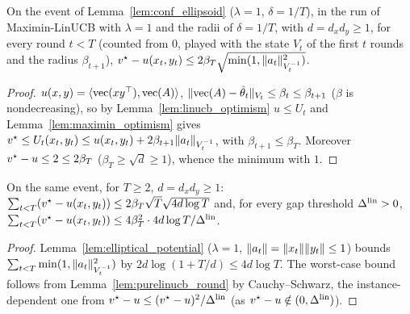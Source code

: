 \begin{lemma}
  \label{lem:purelinucb_round}
  \leanok
  On the event of Lemma~\ref{lem:conf_ellipsoid} ($\lambda = 1$, $\delta = 1/T$), in the run of
  Maximin-LinUCB with $\lambda = 1$ and the radii of $\delta = 1/T$, with $d = d_x d_y \ge 1$, for
  every round $t < T$ (counted from $0$, played with the state $V_t$ of the first $t$ rounds and the
  radius $\beta_{t+1}$), $v^\star - u(x_t, y_t) \le 2 \beta_T \sqrt{\min(1, \lVert a_t \rVert^2_{V_t^{-1}})}$.
\end{lemma}

\begin{proof}
  \leanok
  $u(x, y) = \langle \operatorname{vec}(x y^\top), \operatorname{vec}(A)\rangle$, $\lVert \operatorname{vec}(A) - \hat\theta_t \rVert_{V_t} \le
  \beta_t \le \beta_{t+1}$ ($\beta$ is nondecreasing), so by Lemma~\ref{lem:linucb_optimism} $u \le
  U_t$ and Lemma~\ref{lem:maximin_optimism} gives $v^\star \le U_t(x_t, y_t) \le u(x_t, y_t) + 2
  \beta_{t+1} \lVert a_t \rVert_{V_t^{-1}}$, with $\beta_{t+1} \le \beta_T$. Moreover $v^\star - u \le 2 \le
  2 \beta_T$ ($\beta_T \ge \sqrt d \ge 1$), whence the minimum with $1$.
\end{proof}

\begin{lemma}
  \label{lem:purelinucb_pathwise}
  \leanok
  On the same event, for $T \ge 2$, $d = d_x d_y \ge 1$:
  $\sum_{t < T} (v^\star - u(x_t, y_t)) \le 2 \beta_T \sqrt{T} \sqrt{4 d \log T}$ and, for every gap
  threshold $\Delta^{\mathrm{lin}} > 0$, $\sum_{t < T} (v^\star - u(x_t, y_t)) \le 4 \beta_T^2 \cdot 4 d \log T /
  \Delta^{\mathrm{lin}}$.
\end{lemma}

\begin{proof}
  \leanok
  Lemma~\ref{lem:elliptical_potential} ($\lambda = 1$, $\lVert a_t \rVert = \lVert x_t \rVert \lVert y_t \rVert \le 1$)
  bounds $\sum_{t < T} \min(1, \lVert a_t \rVert^2_{V_t^{-1}})$ by $2 d \log(1 + T/d) \le 4 d \log T$.
  The worst-case bound follows from Lemma~\ref{lem:purelinucb_round} by Cauchy--Schwarz, the
  instance-dependent one from $v^\star - u \le (v^\star - u)^2/\Delta^{\mathrm{lin}}$ (as $v^\star - u \notin (0,
  \Delta^{\mathrm{lin}})$).
\end{proof}

